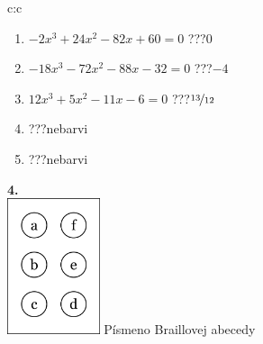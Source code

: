 \documentclass[10pt]{report}
\begin{document}
\begin{tabular}{c:c}
\begin{minipage}[c][104.5mm][t]{0.5\linewidth}
\begin{center}
\begin{minipage}{0.79\linewidth}
\begin{center}
\begin{varwidth}{\linewidth}
\begin{enumerate}
\item $-2x^3+24x^2-82x+60=0$\quad \dotfill\; ???\;\dotfill \quad $0$
\item $-18x^3-72x^2-88x-32=0$\quad \dotfill\; ???\;\dotfill \quad $-4$
\item $12x^3+5x^2-11x-6=0$\quad \dotfill\; ???\;\dotfill \quad $\nicefrac{13}{12}$
\item \quad \dotfill\; ???\;\dotfill \quad nebarvi
\item \quad \dotfill\; ???\;\dotfill \quad nebarvi
\end{enumerate}
\end{varwidth}
\end{center}
\end{minipage}
\begin{minipage}{0.20\linewidth}
\begin{center}
{\Huge\bfseries 4.} \\[2mm]
\includegraphics[height=40mm]{../images/braille.png}
{\small Písmeno Braillovej abecedy}
\end{center}
\end{minipage}
\end{center}
\end{minipage}
%
\end{tabular}
\newpage
\thispagestyle{empty}
\end{document}
